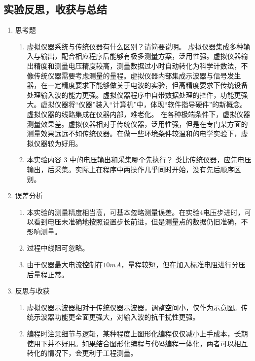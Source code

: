 \documentclass[UTF8]{article}
\begin{document}
\subsection{实验反思，收获与总结}
\begin{enumerate}
    \item 思考题
    \begin{enumerate}
        \item 虚拟仪器系统与传统仪器有什么区别？请简要说明。
        \newline \hspace*{2em}虚拟仪器集成多种输入与输出，配合相应程序后能够有极多测量方案，泛用性强。虚拟仪器输出精度和测量电压精度较高，测量数据过小时自动转化为科学计数法，不像传统仪器需要考虑测量的量程。虚拟仪器内部集成示波器与信号发生器，在一定精度要求下能够做关于电波的实验，但高精度要求下传统设备处理输入波的能力更强。虚拟仪器程序中自带数据处理的控件，功能更强大。虚拟仪器将“仪器”装入“计算机”中，体现“软件指导硬件”的新概念。
        虚拟仪器的线路集成在仪器内部，难老化。
        \newline \hspace*{2em}在各种极端条件下，虚拟仪器测量效果差。虚拟仪器相对于传统仪器，泛用性强，但是在专门某方面的测量效果远远不如传统仪器。在做一些环境条件较温和的电学实验下，虚拟仪器较为好用。
        \item 本实验内容 3 中的电压输出和采集哪个先执行？
        \newline \hspace*{2em}类比传统仪器，应先电压输出，后采集。实际上在程序中两操作几乎同时开始，没有先后顺序区别。
    \end{enumerate}
    \item 误差分析
    \begin{enumerate}
        \item 本实验的测量精度相当高，可基本忽略测量误差。在实验4电压步进时，可以看到电压未准确地按照设置步长前进，但是测量点的数据仍旧准确，不影响测量。
        \item 过程中线阻可忽略。
        \item 由于仪器最大电流控制在$10mA$，量程较短，但在加入标准电阻进行分压后量程正常。
    \end{enumerate}
    \item 反思与收获
    \begin{enumerate}
        \item 虚拟仪器示波器相对于传统仪器示波器，调整空间小，仅作为示意图。传统示波器功能更全面更强大，对输入波的抗干扰性更强。
        \item 编程时注意细节与逻辑，某种程度上图形化编程仅仅减小上手成本，长期使用下并不好用。如果结合图形化编程与代码编程一体化，两者可以相互转化的情况下，会更利于工程测量。

\end{enumerate}
\end{enumerate}
\end{document}
